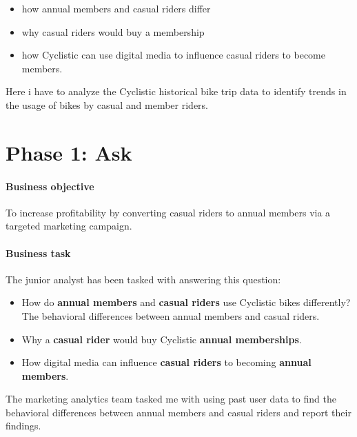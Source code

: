 \documentclass[
]{article}
\providecommand{\tightlist}{%
  \setlength{\itemsep}{0pt}\setlength{\parskip}{0pt}}
\begin{document}
\begin{itemize}
\tightlist
\item
  how annual members and casual riders differ
\item
  why casual riders would buy a membership
\item
  how Cyclistic can use digital media to influence casual riders to
  become members.
\end{itemize}

Here i have to analyze the Cyclistic historical bike trip data to
identify trends in the usage of bikes by casual and member riders.

\hypertarget{phase-1-ask}{%
\section{\texorpdfstring{\textbf{Phase 1:
Ask}}{Phase 1: Ask}}\label{phase-1-ask}}

\hypertarget{business-objective}{%
\paragraph{\texorpdfstring{\textbf{Business
objective}}{Business objective}}\label{business-objective}}

To increase profitability by converting casual riders to annual members
via a targeted marketing campaign.

\hypertarget{business-task}{%
\paragraph{\texorpdfstring{\textbf{Business
task}}{Business task}}\label{business-task}}

The junior analyst has been tasked with answering this question:

\begin{itemize}
\tightlist
\item
  How do \textbf{annual members} and \textbf{casual riders} use
  Cyclistic bikes differently? The behavioral differences between annual
  members and casual riders.
\item
  Why a \textbf{casual rider} would buy Cyclistic \textbf{annual
  memberships}.
\item
  How digital media can influence \textbf{casual riders} to becoming
  \textbf{annual members}.
\end{itemize}

The marketing analytics team tasked me with using past user data to find
the behavioral differences between annual members and casual riders and
report their findings.
\end{document}
